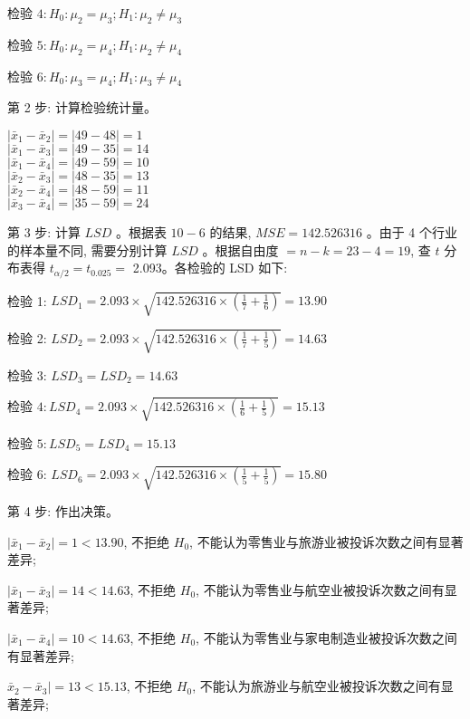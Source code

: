 \documentclass[10pt]{article}
\begin{document}
\begin{CJK*}{UTF8}{bsmi}
检验 $4: H_{0}: \mu_{2}=\mu_{3} ; H_{1}: \mu_{2} \neq \mu_{3}$

检验 $5: H_{0}: \mu_{2}=\mu_{4} ; H_{1}: \mu_{2} \neq \mu_{4}$

检验 $6: H_{0}: \mu_{3}=\mu_{4} ; H_{1}: \mu_{3} \neq \mu_{4}$

第 2 步: 计算检验统计量。

$\left|\bar{x}_{1}-\bar{x}_{2}\right|=|49-48|=1$\\
$\left|\bar{x}_{1}-\bar{x}_{3}\right|=|49-35|=14$\\
$\left|\bar{x}_{1}-\bar{x}_{4}\right|=|49-59|=10$\\
$\left|\bar{x}_{2}-\bar{x}_{3}\right|=|48-35|=13$\\
$\left|\bar{x}_{2}-\bar{x}_{4}\right|=|48-59|=11$\\
$\left|\bar{x}_{3}-\bar{x}_{4}\right|=|35-59|=24$

第 3 步: 计算 $L S D$ 。根据表 $10-6$ 的结果, $M S E=142.526316$ 。由于 4 个行业的样本量不同, 需要分别计算 $L S D$ 。根据自由度 $=n-k=23-4=19$, 查 $t$ 分布表得 $t_{\alpha / 2}=t_{0.025}=$ 2.093。各检验的 LSD 如下:

检验 1: $L S D_{1}=2.093 \times \sqrt{142.526316 \times\left(\frac{1}{7}+\frac{1}{6}\right)}=13.90$

检验 2: $L S D_{2}=2.093 \times \sqrt{142.526316 \times\left(\frac{1}{7}+\frac{1}{5}\right)}=14.63$

检验 3: $L S D_{3}=L S D_{2}=14.63$

检验 $4: L S D_{4}=2.093 \times \sqrt{142.526316 \times\left(\frac{1}{6}+\frac{1}{5}\right)}=15.13$

检验 $5: L S D_{5}=L S D_{4}=15.13$

检验 6: $L S D_{6}=2.093 \times \sqrt{142.526316 \times\left(\frac{1}{5}+\frac{1}{5}\right)}=15.80$

第 4 步: 作出决策。

$\left|\bar{x}_{1}-\bar{x}_{2}\right|=1<13.90$, 不拒绝 $H_{0}$, 不能认为零售业与旅游业被投诉次数之间有显著差异;

$\left|\bar{x}_{1}-\bar{x}_{3}\right|=14<14.63$, 不拒绝 $H_{0}$, 不能认为零售业与航空业被投诉次数之间有显著差异;

$\left|\bar{x}_{1}-\bar{x}_{4}\right|=10<14.63$, 不拒绝 $H_{0}$, 不能认为零售业与家电制造业被投诉次数之间\\
有显著差异;

$\bar{x}_{2}-\bar{x}_{3} \mid=13<15.13$, 不拒绝 $H_{0}$, 不能认为旅游业与航空业被投诉次数之间有显著差异;


\end{CJK*}
\end{document}
